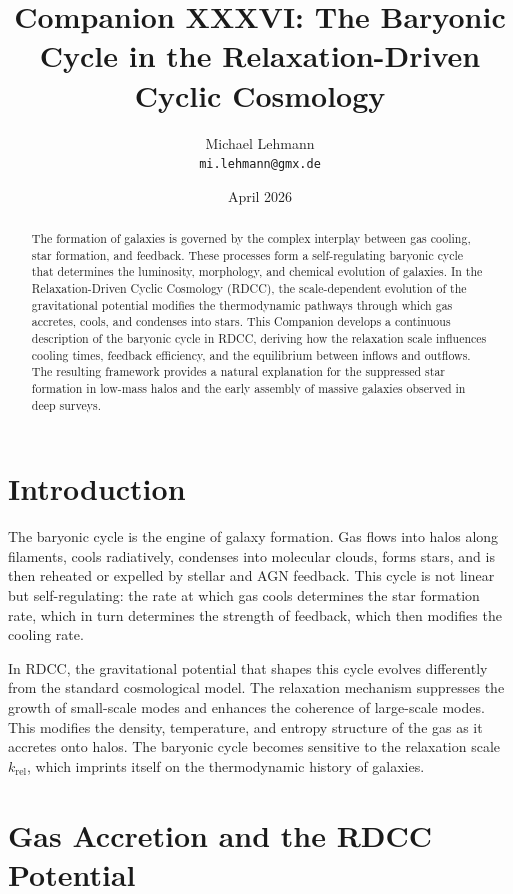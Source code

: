 \documentclass[11pt,a4paper]{article}
\title{\textbf{Companion XXXVI: The Baryonic Cycle in the Relaxation-Driven Cyclic Cosmology}}
\author{Michael Lehmann \\ \texttt{mi.lehmann@gmx.de}}
\date{April 2026}
\begin{document}
\maketitle

\begin{abstract}
The formation of galaxies is governed by the complex interplay between gas cooling, 
star formation, and feedback. These processes form a self-regulating baryonic cycle 
that determines the luminosity, morphology, and chemical evolution of galaxies. 
In the Relaxation-Driven Cyclic Cosmology (RDCC), the scale-dependent evolution of 
the gravitational potential modifies the thermodynamic pathways through which gas 
accretes, cools, and condenses into stars. This Companion develops a continuous 
description of the baryonic cycle in RDCC, deriving how the relaxation scale 
influences cooling times, feedback efficiency, and the equilibrium between inflows 
and outflows. The resulting framework provides a natural explanation for the 
suppressed star formation in low-mass halos and the early assembly of massive 
galaxies observed in deep surveys.
\end{abstract}
\section{Introduction}

The baryonic cycle is the engine of galaxy formation. Gas flows into halos along 
filaments, cools radiatively, condenses into molecular clouds, forms stars, and is 
then reheated or expelled by stellar and AGN feedback. This cycle is not linear but 
self-regulating: the rate at which gas cools determines the star formation rate, 
which in turn determines the strength of feedback, which then modifies the cooling 
rate.

In RDCC, the gravitational potential that shapes this cycle evolves differently 
from the standard cosmological model. The relaxation mechanism suppresses the 
growth of small-scale modes and enhances the coherence of large-scale modes. This 
modifies the density, temperature, and entropy structure of the gas as it accretes 
onto halos. The baryonic cycle becomes sensitive to the relaxation scale 
$k_{\mathrm{rel}}$, which imprints itself on the thermodynamic history of galaxies.
\section{Gas Accretion and the RDCC Potential}
\end{document}
